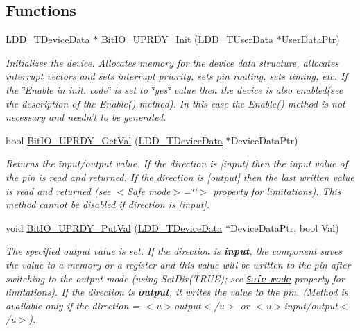\subsection*{Functions}
\begin{DoxyCompactItemize}
\item 
\hyperlink{group___p_e___types__module_gac5cf1362f1f0e3a2ce71b1bf2276d091}{L\-D\-D\-\_\-\-T\-Device\-Data} $\ast$ \hyperlink{group___bit_i_o___u_p_r_d_y__module_ga16fba3e6a57959037ec1b6f4183a93bf}{Bit\-I\-O\-\_\-\-U\-P\-R\-D\-Y\-\_\-\-Init} (\hyperlink{group___p_e___types__module_ga0b66a73f87238a782318aa0be7578e35}{L\-D\-D\-\_\-\-T\-User\-Data} $\ast$User\-Data\-Ptr)
\begin{DoxyCompactList}\small\item\em Initializes the device. Allocates memory for the device data structure, allocates interrupt vectors and sets interrupt priority, sets pin routing, sets timing, etc. If the \char`\"{}\-Enable
    in init. code\char`\"{} is set to \char`\"{}yes\char`\"{} value then the device is also enabled(see the description of the Enable() method). In this case the Enable() method is not necessary and needn't to be generated. \end{DoxyCompactList}\item 
bool \hyperlink{group___bit_i_o___u_p_r_d_y__module_ga81bcdf8e406ba157db74916e9e92fe1b}{Bit\-I\-O\-\_\-\-U\-P\-R\-D\-Y\-\_\-\-Get\-Val} (\hyperlink{group___p_e___types__module_gac5cf1362f1f0e3a2ce71b1bf2276d091}{L\-D\-D\-\_\-\-T\-Device\-Data} $\ast$Device\-Data\-Ptr)
\begin{DoxyCompactList}\small\item\em Returns the input/output value. If the direction is \mbox{[}input\mbox{]} then the input value of the pin is read and returned. If the direction is \mbox{[}output\mbox{]} then the last written value is read and returned (see $<$\-Safe mode$>$=\char`\"{}\char`\"{}$>$ property for limitations). This method cannot be disabled if direction is \mbox{[}input\mbox{]}. \end{DoxyCompactList}\item 
void \hyperlink{group___bit_i_o___u_p_r_d_y__module_gaf732785b20487680826483805a012205}{Bit\-I\-O\-\_\-\-U\-P\-R\-D\-Y\-\_\-\-Put\-Val} (\hyperlink{group___p_e___types__module_gac5cf1362f1f0e3a2ce71b1bf2276d091}{L\-D\-D\-\_\-\-T\-Device\-Data} $\ast$Device\-Data\-Ptr, bool Val)
\begin{DoxyCompactList}\small\item\em The specified output value is set. If the direction is {\bfseries  input}, the component saves the value to a memory or a register and this value will be written to the pin after switching to the output mode (using {\ttfamily Set\-Dir(\-T\-R\-U\-E)}; see \href{BitIOProperties.html#SafeMode}{\tt Safe mode} property for limitations). If the direction is {\bfseries output}, it writes the value to the pin. (Method is available only if the direction = $<$u$>${\ttfamily output}$<$/u$>$ or $<$u$>${\ttfamily  input/output}$<$/u$>$). \end{DoxyCompactList}\item 

\end{DoxyCompactItemize}

